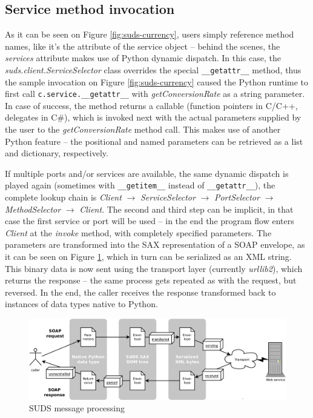 \subsection{Service method invocation}
\label{sudsInvocation}

As it can be seen on Figure \ref{fig:suds-currency}, users simply reference method names, like it's the attribute of the service object -- behind the scenes, the \emph{services} attribute makes use of Python dynamic dispatch. In this case, the \emph{suds.client.ServiceSelector} class overrides the special \verb|__getattr__| method, thus the sample invocation on Figure \ref{fig:suds-currency} caused the Python runtime to first call \verb|c.service.__getattr__| with \emph{getConversionRate} as a string parameter. In case of success, the method returns a callable (function pointers in C/C++, delegates in C\#), which is invoked next with the actual parameters supplied by the user to the \emph{getConversionRate} method call. This makes use of another Python feature -- the positional and named parameters can be retrieved as a list and dictionary, respectively.

If multiple ports and/or services are available, the same dynamic dispatch is played again (sometimes with \verb|__getitem__| instead of \verb|__getattr__|), the complete lookup chain is \emph{Client} $\rightarrow$ \emph{ServiceSelector} $\rightarrow$ \emph{PortSelector} $\rightarrow$ \emph{MethodSelector} $\rightarrow$ \emph{Client}. The second and third step can be implicit, in that case the first service or port will be used -- in the end the program flow enters \emph{Client} at the \emph{invoke} method, with completely specified parameters. The parameters are transformed into the SAX representation of a SOAP envelope, as it can be seen on Figure \ref{fig:sudsMessage}, which in turn can be serialized as an XML string. This binary data is now sent using the transport layer (currently \emph{urllib2}), which returns the response -- the same process gets repeated as with the request, but reversed. In the end, the caller receives the response transformed back to instances of data types native to Python.

\begin{figure}[htbp]
 \centering
 \includegraphics[width=\textwidth]{images/sudsMessage.pdf}
 \caption{SUDS message processing}
 \label{fig:sudsMessage}
\end{figure}

